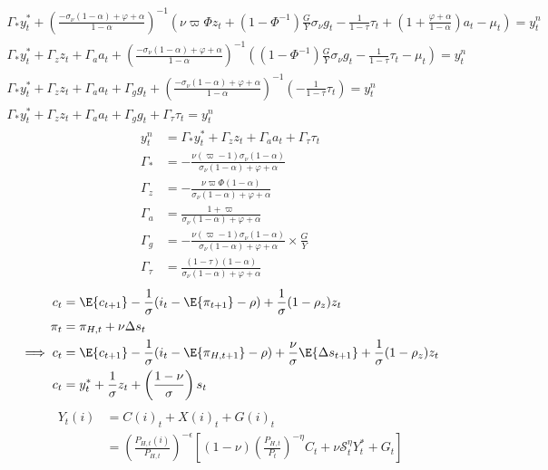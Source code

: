 \begin{align*}
    \Gamma_* y^*_t + \left(\frac{-\sigma_\nu(1-\alpha) + \varphi + \alpha}{1-\alpha}\right)^{-1}\left(\nu \varpi \Phi z_t + (1 - \Phi^{-1}) \frac{G}{Y} \sigma_\nu g_t - \frac{1}{1-\tau}\tau_t  + \left(1 + \frac{\varphi + \alpha}{1-\alpha}\right)a_t -\mu_t \right)= y^n_t\\
    \Gamma_* y^*_t + \Gamma_z z_t + \Gamma_a a_t + \left(\frac{-\sigma_\nu(1-\alpha) + \varphi + \alpha}{1-\alpha}\right)^{-1}\left((1 - \Phi^{-1}) \frac{G}{Y} \sigma_\nu g_t - \frac{1}{1-\tau}\tau_t -\mu_t \right)= y^n_t\\
    \Gamma_* y^*_t + \Gamma_z z_t + \Gamma_a a_t + \Gamma_g g_t + \left(\frac{-\sigma_\nu(1-\alpha) + \varphi + \alpha}{1-\alpha}\right)^{-1}\left(- \frac{1}{1-\tau}\tau_t \right)= y^n_t\\
    \Gamma_* y^*_t + \Gamma_z z_t + \Gamma_a a_t + \Gamma_g g_t + \Gamma_\tau \tau_t = y^n_t
\end{align*}
\begin{align}
    y^n_t &= \Gamma_* y^*_t + \Gamma_z z_t + \Gamma_a a_t + \Gamma_\tau \tau_t \\
    \Gamma_* &= -\frac{\nu(\varpi - 1)\sigma_\nu(1-\alpha)}{\sigma_\nu (1-\alpha) + \varphi + \alpha} \\
    \Gamma_z &= -\frac{\nu \varpi \Phi (1-\alpha)}{\sigma_\nu (1-\alpha) + \varphi + \alpha} \\
    \Gamma_a &= \frac{1+\varpi}{\sigma_\nu (1-\alpha) + \varphi + \alpha} \\
    \Gamma_g &= -\frac{\nu(\varpi - 1)\sigma_\nu(1-\alpha)}{\sigma_\nu (1-\alpha) + \varphi + \alpha} \times \frac{G}{Y}\\
    \Gamma_\tau &= \frac{(1-\tau)(1-\alpha)}{\sigma_\nu (1-\alpha) + \varphi + \alpha}
\end{align}
\pagebreak
\begin{align}
    c_t &= \E\{ c_{t+1}\} - \frac{1}{\sigma}(i_t - \E \{ \pi_{t+1}\} - \rho) + \frac{1}{\sigma}(1-\rho_z)z_t\\
    \pi_t &= \pi_{H,t} + \nu \Delta s_t\\
    \implies c_t &= \E\{ c_{t+1}\} - \frac{1}{\sigma}(i_t - \E \{ \pi_{H,t+1}\} - \rho) + \frac{\nu}{\sigma}\E \{ \Delta s_{t+1} \} + \frac{1}{\sigma}(1-\rho_z)z_t\\
    c_t &= y_t^* + \frac{1}{\sigma}z_t + \left(\frac{1-\nu}{\sigma}\right)s_t
\end{align}
\begin{align}
    Y_{t}(i) &= C(i)_t + X(i)_{t} + G(i)_t \\
&=\left(\frac{P_{H,t}(i)}{P_{H,t}}\right)^{-\epsilon}\left[ (1-\nu)\left(\frac{P_{H,t}}{P_t}\right)^{-\eta}C_t + \nu \mathcal{S}_t^{\eta}Y_t^* + G_t\right]
\end{align}
